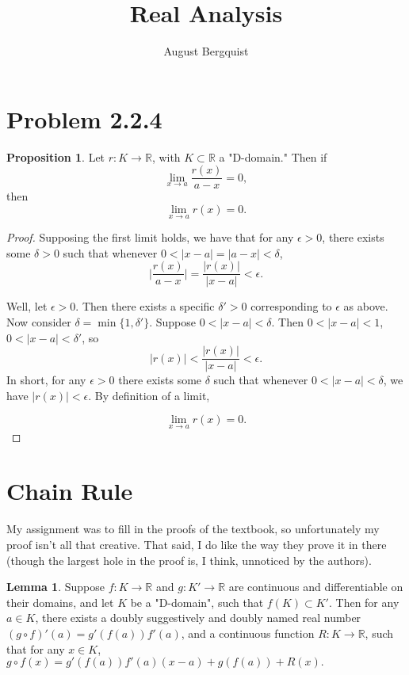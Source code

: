 \documentclass[11pt]{article}
\title{Real Analysis}
\author{August Bergquist}
\newcommand{\R}{\mathbb{R}}
\theoremstyle{definition}
\newtheorem{proposition}{Proposition}
\newtheorem{lemma}{Lemma}
\begin{document}
\maketitle
\section{Problem 2.2.4}


\begin{proposition}
Let \(r:K\to \R\), with \(K\subset \R\) a "D-domain." Then if 
\[
\lim_{x\to a}\frac{r(x)}{a-x} = 0,
\]
then
\[
\lim_{x\to a}r(x) = 0.
\]
\end{proposition}

\begin{proof}
Supposing the first limit holds, we have that for any \(\epsilon > 0\), there exists some \(\delta>0\) such that whenever \(0 < |x-a| =|a-x| < \delta\), 
\[
 \Big| \frac{r(x)}{a-x} \Big| = \frac{|r(x)|}{|x-a|} < \epsilon.
\]

Well, let \(\epsilon > 0\). Then there exists a specific \(\delta' > 0\) corresponding to \(\epsilon \) as above. Now consider \(\delta = \min\{1, \delta'\}\). Suppose \(0<|x-a|< \delta\). Then \(0 < |x-a| < 1\), \(0 < |x-a| < \delta'\), so 
\[
|r(x)| < \frac{|r(x)|}{|x-a|} < \epsilon.
\]
In short, for any \(\epsilon > 0\) there exists some \(\delta\) such that whenever \(0 <|x - a| < \delta\), we have \(|r(x)| < \epsilon\). By definition of a limit,

\[
\lim_{x\to a}r(x) = 0.
\]

\end{proof}

\section{Chain Rule}

My assignment was to fill in the proofs of the textbook, so unfortunately my proof isn't all that creative. That said, I do like the way they prove it in there (though the largest hole in the proof is, I think, unnoticed by the authors).

\begin{lemma}
Suppose \(f:K\to \R\) and \(g:K'\to \R\) are continuous and differentiable on their domains, and let \(K\) be a "D-domain", such that $f(K) \subset K'$. Then for any \(a\in K\), there exists a doubly suggestively and doubly named real number
\((g\circ f)'(a) = g'(f(a))f'(a)\), and a continuous function $R:K\to \R$, such that for any $x\in K$, $g\circ f(x) = g'(f(a))f'(a)(x- a) + g(f(a)) + R(x).$
\end{lemma}
\end{document}
